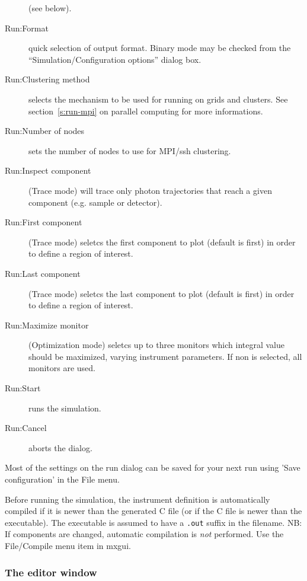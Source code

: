 \begin{description}
  (see below).
\item[Run:Format] quick selection of output format. Binary mode may be checked from the ``Simulation/Configuration options'' dialog box.
\item[Run:Clustering method] selects the mechanism to be used for running on grids and clusters.
  See section~\ref{s:run-mpi} on parallel computing for more informations.
\item[Run:Number of nodes] sets the number of nodes to use for MPI/ssh clustering.
\item[Run:Inspect component] (Trace mode) will trace only photon trajectories that reach a given component (e.g. sample or detector).
\item[Run:First component] (Trace mode) seletcs the first component to plot (default is first) in order to define a region of interest.
\item[Run:Last component] (Trace mode) seletcs the last component to plot (default is first) in order to define a region of interest.
\item[Run:Maximize monitor] (Optimization mode) seletcs up to three monitors which integral value should be maximized, varying instrument parameters. If non is selected, all monitors are used.
\item[Run:Start] runs the simulation.
\item[Run:Cancel] aborts the dialog.
\end{description}
Most of the settings on the run dialog can be saved for your next
\MCX run using 'Save configuration' in the File menu.

Before running the simulation, the instrument definition is
automatically compiled if it is newer than the generated C file (or if the C file
is newer than the executable). The executable is
assumed to have a \verb+.out+ suffix in the filename. NB: If
components are changed, automatic compilation is \emph{not}
performed. Use the File/Compile menu item in mxgui.



\subsubsection{The editor window}

